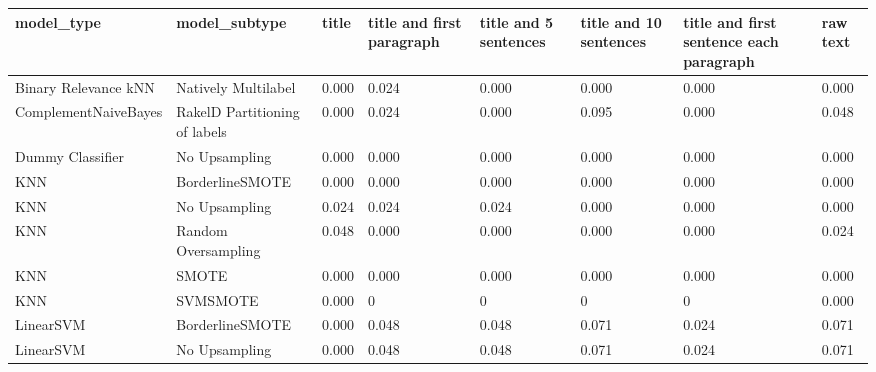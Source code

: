 \begin{tabular}{llllllll}
\toprule
                     model\_type &                 model\_subtype & title & title and first paragraph & title and 5 sentences & title and 10 sentences & title and first sentence each paragraph &  raw text \\
\midrule
           Binary Relevance kNN &           Natively Multilabel & 0.000 &                     0.024 &                 0.000 &                  0.000 &                                   0.000 &     0.000 \\
           ComplementNaiveBayes & RakelD Partitioning of labels & 0.000 &                     0.024 &                 0.000 &                  0.095 &                                   0.000 &     0.048 \\
               Dummy Classifier &                 No Upsampling & 0.000 &                     0.000 &                 0.000 &                  0.000 &                                   0.000 &     0.000 \\
                            KNN &               BorderlineSMOTE & 0.000 &                     0.000 &                 0.000 &                  0.000 &                                   0.000 &     0.000 \\
                            KNN &                 No Upsampling & 0.024 &                     0.024 &                 0.024 &                  0.000 &                                   0.000 &     0.000 \\
                            KNN &           Random Oversampling & 0.048 &                     0.000 &                 0.000 &                  0.000 &                                   0.000 &     0.024 \\
                            KNN &                         SMOTE & 0.000 &                     0.000 &                 0.000 &                  0.000 &                                   0.000 &     0.000 \\
                            KNN &                      SVMSMOTE & 0.000 &                         0 &                     0 &                      0 &                                       0 &     0.000 \\
                      LinearSVM &               BorderlineSMOTE & 0.000 &                     0.048 &                 0.048 &                  0.071 &                                   0.024 &     0.071 \\
                      LinearSVM &                 No Upsampling & 0.000 &                     0.048 &                 0.048 &                  0.071 &                                   0.024 &     0.071 \\

\end{tabular}
